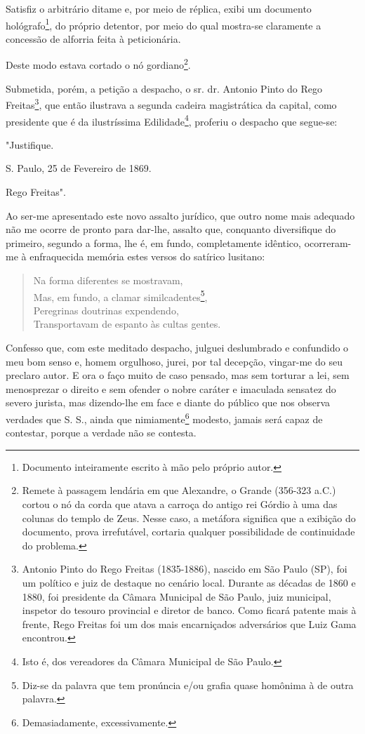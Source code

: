 Satisfiz o arbitrário ditame e, por meio de réplica, exibi um documento
hológrafo\footnote{Documento inteiramente escrito à mão pelo próprio
  autor.}, do próprio detentor, por meio do qual mostra-se claramente a
concessão de alforria feita à peticionária.

Deste modo estava cortado o nó gordiano\footnote{Remete à passagem
  lendária em que Alexandre, o Grande (356-323 a.C.) cortou o nó da
  corda que atava a carroça do antigo rei Górdio à uma das colunas do
  templo de Zeus. Nesse caso, a metáfora significa que a exibição do
  documento, prova irrefutável, cortaria qualquer possibilidade de
  continuidade do problema.}.

Submetida, porém, a petição a despacho, o sr. dr. Antonio Pinto do Rego
Freitas\footnote{Antonio Pinto do Rego Freitas (1835-1886), nascido em
  São Paulo (SP), foi um político e juiz de destaque no cenário local.
  Durante as décadas de 1860 e 1880, foi presidente da Câmara Municipal
  de São Paulo, juiz municipal, inspetor do tesouro provincial e diretor
  de banco. Como ficará patente mais à frente, Rego Freitas foi um dos
  mais encarniçados adversários que Luiz Gama encontrou.}, que então
ilustrava a segunda cadeira magistrática da capital, como presidente que
é da ilustríssima Edilidade\footnote{Isto é, dos vereadores da Câmara
  Municipal de São Paulo.}, proferiu o despacho que segue-se:

"Justifique.

S. Paulo, 25 de Fevereiro de 1869.

Rego Freitas".

Ao ser-me apresentado este novo assalto jurídico, que outro nome mais
adequado não me ocorre de pronto para dar-lhe, assalto que, conquanto
diversifique do primeiro, segundo a forma, lhe é, em fundo,
completamente idêntico, ocorreram-me à enfraquecida memória estes versos
do satírico lusitano:

\begin{verse}
Na forma diferentes se mostravam,\\
Mas, em fundo, a clamar similcadentes\footnote{Diz-se da palavra que
  tem pronúncia e/ou grafia quase homônima à de outra palavra.},\\
Peregrinas doutrinas expendendo,\\
Transportavam de espanto às cultas gentes.
\end{verse}

Confesso que, com este meditado despacho, julguei deslumbrado e
confundido o meu bom senso e, homem orgulhoso, jurei, por tal decepção,
vingar-me do seu preclaro autor. E ora o faço muito de caso pensado, mas
sem torturar a lei, sem menosprezar o direito e sem ofender o nobre
caráter e imaculada sensatez do severo jurista, mas dizendo-lhe em face
e diante do público que nos observa verdades que S. S., ainda que
nimiamente\footnote{Demasiadamente, excessivamente.} modesto, jamais
será capaz de contestar, porque a verdade não se contesta.

